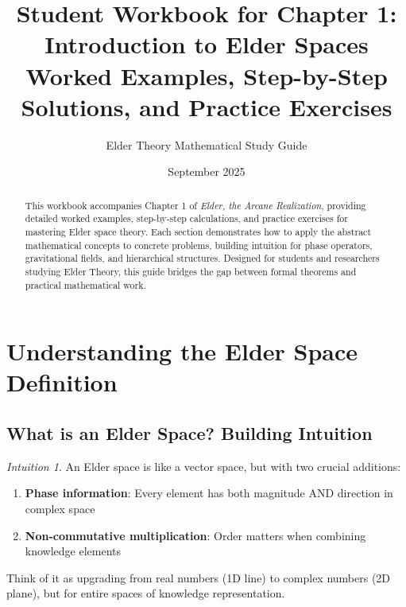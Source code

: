 \documentclass[12pt,a4paper]{article}
\title{\textbf{Student Workbook for Chapter 1:}\\
\Large{Introduction to Elder Spaces}\\
\large{Worked Examples, Step-by-Step Solutions, and Practice Exercises}}
\author{Elder Theory Mathematical Study Guide}
\date{September 2025}
\theoremstyle{definition}
\theoremstyle{remark}
\newtheorem*{intuition}{Intuition}
\begin{document}
\maketitle

\begin{abstract}
This workbook accompanies Chapter 1 of \textit{Elder, the Arcane Realization}, providing detailed worked examples, step-by-step calculations, and practice exercises for mastering Elder space theory. Each section demonstrates how to apply the abstract mathematical concepts to concrete problems, building intuition for phase operators, gravitational fields, and hierarchical structures. Designed for students and researchers studying Elder Theory, this guide bridges the gap between formal theorems and practical mathematical work.
\end{abstract}

\tableofcontents
\newpage

\section{Understanding the Elder Space Definition}

\subsection{What is an Elder Space? Building Intuition}

\begin{intuition}
An Elder space is like a vector space, but with two crucial additions:
\begin{enumerate}
\item \textbf{Phase information}: Every element has both magnitude AND direction in complex space
\item \textbf{Non-commutative multiplication}: Order matters when combining knowledge elements
\end{enumerate}

Think of it as upgrading from real numbers (1D line) to complex numbers (2D plane), but for entire spaces of knowledge representation.
\end{intuition}
\end{document}
